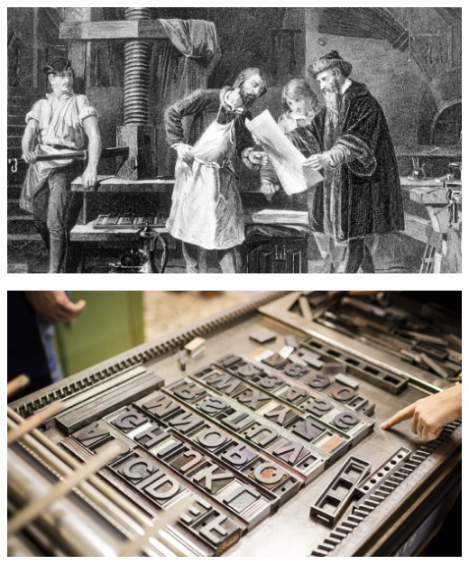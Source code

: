 \begin{multicols}{2}
	\begin{center}
	\includegraphics[width=\linewidth]{./IMG/02.jpg}
\end{center}

\vfill
\columnbreak

	\begin{center}
		\includegraphics[width=\linewidth]{./IMG/03-1.jpg}
	\end{center}
\end{multicols}

\vfill
\pagebreak